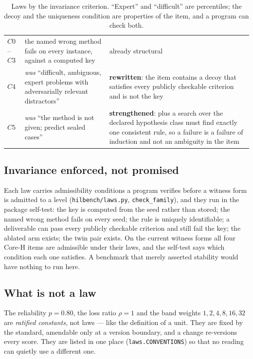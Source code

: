 \documentclass[11pt]{article}
\theoremstyle{definition}
\begin{document}
\begin{table}[!htbp]
\begin{tabularx}{\textwidth}{@{}>{\raggedright\arraybackslash}p{1.1cm}>{\raggedright\arraybackslash}p{6.2cm}Y@{}}
$C0$--$C3$ & the named wrong method fails on every instance, against a computed key & already structural \\
$C4$ & \emph{was} ``difficult, ambiguous, expert problems with adversarially relevant distractors'' & \textbf{rewritten}: the item contains a decoy that satisfies every publicly checkable criterion and is not the key \\
$C5$ & \emph{was} ``the method is not given; predict sealed cases'' & \textbf{strengthened}: plus a search over the declared hypothesis class must find exactly one consistent rule, so a failure is a failure of induction and not an ambiguity in the item \\
\bottomrule
\end{tabularx}
\caption{Laws by the invariance criterion. ``Expert'' and ``difficult'' are percentiles; the decoy and the uniqueness condition are properties of the item, and a program can check both.}
\label{tab:invariance}
\end{table}

\subsection{Invariance enforced, not promised}

Each law carries admissibility conditions a program verifies before a witness form is admitted to a level (\texttt{hilbench/laws.py}, \texttt{check\_family}), and they run in the package self-test: the key is computed from the seed rather than stored; the named wrong method fails on every seed; the rule is uniquely identifiable; a deliverable can pass every publicly checkable criterion and still fail the key; the ablated arm exists; the twin pair exists. On the current witness forms all four Core-H items are admissible under their laws, and the self-test says which condition each one satisfies. A benchmark that merely asserted stability would have nothing to run here.

\subsection{What is not a law}

The reliability $p = 0.80$, the loss ratio $\rho = 1$ and the band weights $1,2,4,8,16,32$ are \emph{ratified constants}, not laws --- like the definition of a unit. They are fixed by the standard, amendable only at a version boundary, and a change re-versions every score. They are listed in one place (\texttt{laws.CONVENTIONS}) so that no reading can quietly use a different one.
\end{document}
